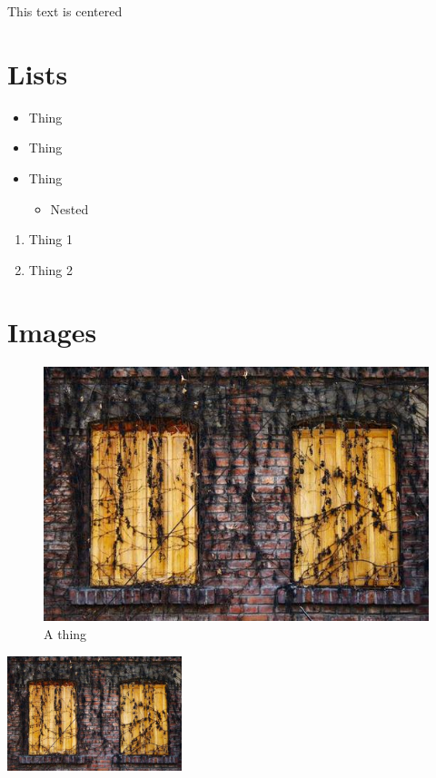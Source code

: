 \documentclass[10pt, letterpaper]{article}  %
\begin{document}
\begin{center}
    This text is centered
\end{center}



\section{Lists}

\begin{itemize}  %
    \item Thing
    \item Thing
    \item Thing
    \begin{itemize}
        \item Nested
    \end{itemize}
\end{itemize}

\noindent \hrulefill{}

\begin{enumerate}  %
    \item Thing 1
    \item Thing 2
\end{enumerate}


\section{Images}

\begin{figure}[h]  %
    \centering
    \includegraphics[width=0.75\linewidth]{images/image.jpg}
    \captionsetup{labelformat=empty}  %
    \caption{A thing}
\end{figure}

\includegraphics[width=2in]{images/image.jpg}
\end{document}
